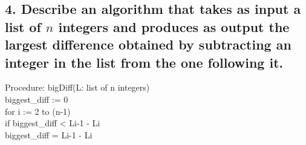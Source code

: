 \documentclass[11pt, oneside]{article} %
\numberwithin{equation}{section} %
\numberwithin{figure}{section} %
\numberwithin{table}{section} %
\begin{document}
\subsection{4. Describe an algorithm that takes as input a list of $n$ integers and produces as output the largest difference obtained by subtracting an integer in the list from the one following it.}
Procedure: bigDiff(L: list of n integers)\\
biggest_diff := 0 \\
for i := 2 to (n-1) \\
if biggest_diff < Li-1 - Li \\
biggest_diff = Li-1 - Li

\end{document}
